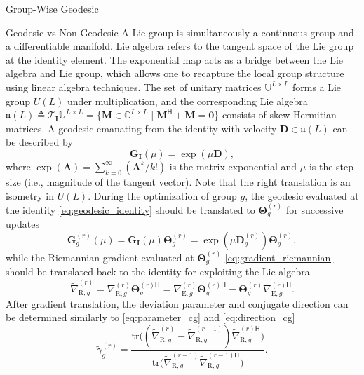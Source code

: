 \documentclass[journal]{IEEEtran}
\begin{document}
\begin{section}{Group-Wise Geodesic }
\begin{subsection}{Geodesic vs Non-Geodesic }
		A Lie group is simultaneously a continuous group and a differentiable manifold.
		Lie algebra refers to the tangent space of the Lie group at the identity element.
		The exponential map acts as a bridge between the Lie algebra and Lie group, which allows one to recapture the local group structure using linear algebra techniques.
		The set of unitary matrices $\mathbb{U}^{L \times L}$ forms a Lie group $U(L)$ under multiplication, and the corresponding Lie algebra $\mathfrak{u}(L) \triangleq \mathcal{T}_{\mathbf{I}}\mathbb{U}^{L \times L} = \{\mathbf{M} \in \mathbb{C}^{L \times L} \mid \mathbf{M}^\mathsf{H} + \mathbf{M} = \mathbf{0}\}$ consists of skew-Hermitian matrices.
		A geodesic emanating from the identity with velocity $\mathbf{D} \in \mathfrak{u}(L)$ can be described by \cite{Edelman1998}
		\begin{equation}
			\mathbf{G}_\mathbf{I}(\mu) = \exp(\mu \mathbf{D}),
			\label{eq:geodesic_identity}
		\end{equation}
		where $\exp(\mathbf{A}) = \sum_{k=0}^\infty (\mathbf{A}^k/k!)$ is the matrix exponential and $\mu$ is the step size (i.e., magnitude of the tangent vector).
		Note that the right translation is an isometry in $U(L)$.
		During the optimization of group $g$, the geodesic evaluated at the identity \eqref{eq:geodesic_identity} should be translated to $\mathbf{\Theta}_g^{(r)}$ for successive updates \cite{Abrudan2008}
		\begin{equation}
			\mathbf{G}_g^{(r)}(\mu) = \mathbf{G}_\mathbf{I}(\mu) \mathbf{\Theta}_g^{(r)} = \exp(\mu \mathbf{D}_g^{(r)}) \mathbf{\Theta}_g^{(r)},
			\label{eq:geodesic_translated}
		\end{equation}
		while the Riemannian gradient evaluated at $\mathbf{\Theta}_g^{(r)}$ \eqref{eq:gradient_riemannian} should be translated back to the identity for exploiting the Lie algebra \cite{Abrudan2008}
		\begin{equation}
			\tilde{\nabla}_{\mathrm{R},g}^{(r)} = \nabla_{\mathrm{R},g}^{(r)} \mathbf{\Theta}_g^{(r)\mathsf{H}} = \nabla_{\mathrm{E},g}^{(r)} \mathbf{\Theta}_g^{(r)\mathsf{H}} - \mathbf{\Theta}_g^{(r)} {\nabla_{\mathrm{E},g}^{(r)\mathsf{H}}}.
			\label{eq:gradient_translated}
		\end{equation}
		After gradient translation, the deviation parameter and conjugate direction can be determined similarly to \eqref{eq:parameter_cg} and \eqref{eq:direction_cg}
		\begin{equation}
			\tilde{\gamma}_g^{(r)} = \frac{\mathrm{tr}\bigl((\tilde{\nabla}_{\mathrm{R},g}^{(r)} - \tilde{\nabla}_{\mathrm{R},g}^{(r-1)}) {\tilde{\nabla}_{\mathrm{R},g}^{(r)\mathsf{H}}}\bigr)}{\mathrm{tr}\bigl(\tilde{\nabla}_{\mathrm{R},g}^{(r-1)} {\tilde{\nabla}_{\mathrm{R},g}^{(r-1)\mathsf{H}}}\bigr)}. %

\end{equation}
\end{subsection}
\end{section}
\end{document}
